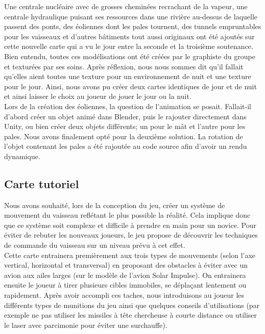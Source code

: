 \documentclass[12pt, titlepage]{article}
\begin{document}
\begin{spacing}{1.5}
Une centrale nucléaire avec de grosses cheminées recrachant de la vapeur, une centrale hydraulique puisant ses ressources dans une rivière au-dessus de laquelle passent des ponts, des éoliennes dont les pales tournent, des tunnels empruntables pour les vaisseaux et d’autres bâtiments tout aussi originaux ont été ajoutés sur cette nouvelle carte qui a vu le jour entre la seconde et la troisième soutenance. Bien entendu, toutes ces modélisations ont été créées par le graphiste du groupe et texturées par ses soins. Après réflexion, nous nous sommes dit qu'il fallait qu'elles aient toutes une texture pour un environnement de nuit et une texture pour le jour. Ainsi, nous avons pu créer deux cartes identiques de jour et de nuit et ainsi laisser le choix au joueur de jouer le jour ou la nuit.\\

Lors de la création des éoliennes, la question de l'animation se posait. Fallait-il d'abord créer un objet animé dans Blender, puis le rajouter directement dans Unity, ou bien créer deux objets différents; un pour le mât et l'autre pour les pales. Nous avons finalement opté pour la deuxième solution. La rotation de l'objet contenant les pales a été rajoutée au code source afin d'avoir un rendu dynamique.

\subsection{Carte tutoriel}

 Nous avons souhaité, lors de la conception du jeu, créer un système de mouvement du vaisseau reflétant le plus possible la réalité. Cela implique donc que ce système soit complexe et difficile à prendre en main pour un novice. Pour éviter de rebuter les nouveaux joueurs, le jeu propose de découvrir les techniques de commande du vaisseau sur un niveau prévu à cet effet. \\

Cette carte entrainera premièrement aux trois types de mouvements (selon l'axe vertical, horizontal et transversal) en proposant des obstacles à éviter avec un avion aux ailes larges (sur le modèle de l'avion Solar Impulse). On entrainera ensuite le joueur à tirer plusieurs cibles immobiles, se déplaçant lentement ou rapidement. Après avoir accompli ces taches, nous introduisons au joueur les différents types de munitions du jeu ainsi que quelques conseils d'utilisations (par exemple ne pas utiliser les missiles à tête chercheuse à courte distance ou utiliser le laser avec parcimonie pour éviter une surchauffe). \\


\end{spacing}
\end{document}

